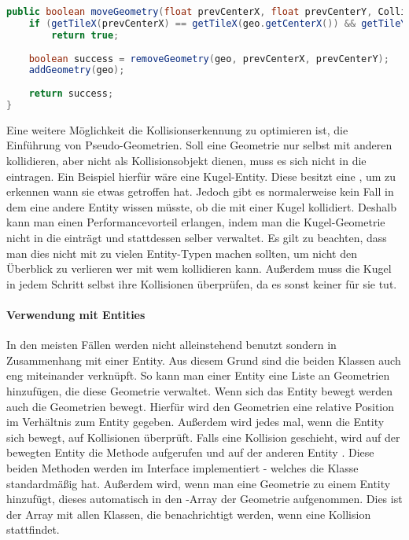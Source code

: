 \doinline
\begin{lstlisting}[caption=Bewegen einer Geometrie in der CollisionMap, title=\hspace{0 pt}, language=java]
public boolean moveGeometry(float prevCenterX, float prevCenterY, CollisionGeometry geo) {
	if (getTileX(prevCenterX) == getTileX(geo.getCenterX()) && getTileY(prevCenterY) == getTileY(geo.getCenterY()))
		return true;
	
	boolean success = removeGeometry(geo, prevCenterX, prevCenterY);
	addGeometry(geo);
	
	return success;
}
\end{lstlisting}

Eine weitere Möglichkeit die Kollisionserkennung zu optimieren ist, die Einführung von Pseudo-Geometrien. Soll eine Geometrie nur selbst mit anderen kollidieren, aber nicht als Kollisionsobjekt dienen, muss es sich nicht in die  eintragen. Ein Beispiel hierfür wäre eine Kugel-Entity.
Diese besitzt eine , um zu erkennen wann sie etwas getroffen hat. Jedoch gibt es normalerweise kein Fall in dem eine andere Entity wissen müsste, ob die mit einer Kugel kollidiert.
Deshalb kann man einen Performancevorteil erlangen, indem man die Kugel-Geometrie nicht in die  einträgt und stattdessen selber verwaltet. Es gilt zu beachten, dass man dies nicht mit zu vielen Entity-Typen machen sollten, um nicht den Überblick zu verlieren wer mit wem kollidieren kann.
Außerdem muss die Kugel in jedem Schritt selbst ihre Kollisionen überprüfen, da es sonst keiner für sie tut.

\paragraph{Verwendung mit Entities}

In den meisten Fällen werden  nicht alleinstehend benutzt sondern in Zusammenhang mit einer Entity. Aus diesem Grund sind die beiden Klassen auch eng miteinander verknüpft. So kann man einer Entity eine Liste an Geometrien hinzufügen, die diese Geometrie verwaltet. Wenn sich das Entity bewegt werden auch die Geometrien bewegt. Hierfür wird den Geometrien eine relative Position im Verhältnis zum Entity gegeben.
Außerdem wird jedes mal, wenn die Entity sich bewegt, auf Kollisionen überprüft. Falls eine Kollision geschieht, wird auf der bewegten Entity die Methode  aufgerufen und auf der anderen Entity . Diese beiden Methoden werden im Interface  implementiert - welches die Klasse  standardmäßig hat. Außerdem wird, wenn man eine Geometrie zu einem Entity hinzufügt, dieses automatisch in den -Array der Geometrie aufgenommen. Dies ist der Array mit allen Klassen, die benachrichtigt werden, wenn eine Kollision stattfindet.

